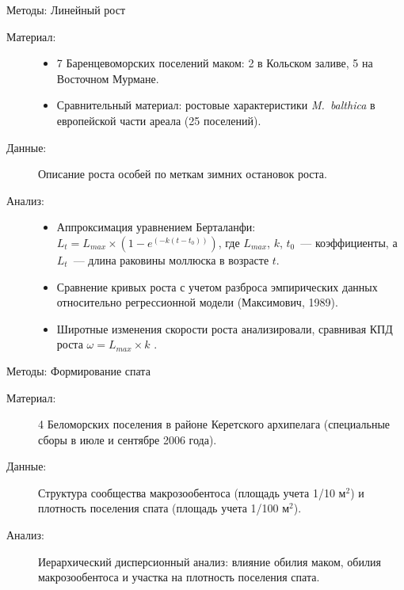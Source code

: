 \documentclass{beamer}
\begin{document}
\begin{frame}{Методы: Линейный рост}
\begin{small}
 \begin{description}
	\item [Материал:] 
		\begin{itemize}
			\item 7 Баренцевоморских поселений маком: 2 в Кольском заливе, 5 на Восточном Мурмане.
			\item Сравнительный материал: ростовые характеристики {\it M.~balthica} в европейской части ареала (25 поселений).
		\end{itemize}
	\item [Данные:] Описание роста особей по меткам зимних остановок роста.
	\item [Анализ:] 
		\begin{itemize}
			\item Аппроксимация уравнением Берталанфи: $L_{t} = L_{max} \times (1 - e^{(-k(t - t_{0}))})$, где $L_{max}$, $k$, $t_{0}$~--- коэффициенты, а $L_{t}$~--- длина раковины моллюска в возрасте $t$.
			\item Сравнение кривых роста с учетом разброса эмпирических данных относительно регрессионной модели (Максимович, 1989).
			\item Широтные изменения скорости роста анализировали, сравнивая КПД роста $\omega = L_{max} \times k$ .
		\end{itemize}
\end{description}
\end{small}
\end{frame}


\begin{frame}{Методы: Формирование спата}
\begin{small}
 \begin{description}
	\item [Материал:] 4 Беломорских поселения в районе Керетского архипелага (специальные сборы в июле и сентябре 2006 года).
	\item [Данные:] Структура сообщества макрозообентоса (площадь учета 1/10 м$^2$) и плотность поселения спата (площадь учета 1/100 м$^2$).
	\item [Анализ:] Иерархический дисперсионный анализ: влияние обилия маком, обилия макрозообентоса и участка на плотность поселения спата.
\end{description}
\end{small}
\end{frame}
\end{document}
